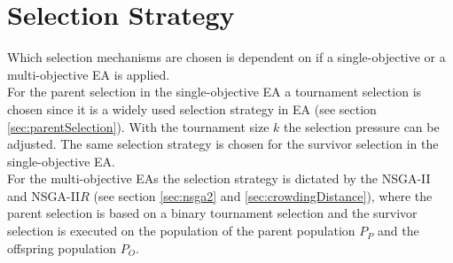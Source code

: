     \section{Selection Strategy}
    Which selection mechanisms are chosen is dependent on if a single-objective or a multi-objective EA is applied.\\
    For the parent selection in the single-objective EA a tournament selection is chosen since it is a widely used selection strategy in EA (see section \ref{sec:parentSelection}). With the tournament size $k$ the selection pressure can be adjusted. The same selection strategy is chosen for the survivor selection in the single-objective EA.\\
    For the multi-objective EAs the selection strategy is dictated by the NSGA-II and NSGA-II$R$ (see section \ref{sec:nsga2} and \ref{sec:crowdingDistance}), where the parent selection is based on a binary tournament selection and the survivor selection is executed on the population of the parent population $P_P$ and the offspring population $P_O$.
    
